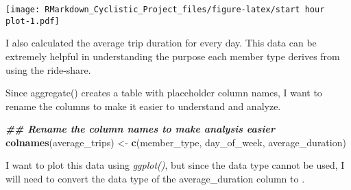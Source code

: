 \documentclass[
]{article}
\newenvironment{Shaded}{\begin{snugshade}}{\end{snugshade}}
\newcommand{\AttributeTok}[1]{\textcolor[rgb]{0.13,0.29,0.53}{#1}}
\newcommand{\DocumentationTok}[1]{\textcolor[rgb]{0.56,0.35,0.01}{\textbf{\textit{#1}}}}
\newcommand{\FunctionTok}[1]{\textcolor[rgb]{0.13,0.29,0.53}{\textbf{#1}}}
\newcommand{\NormalTok}[1]{#1}
\newcommand{\OtherTok}[1]{\textcolor[rgb]{0.56,0.35,0.01}{#1}}
\newcommand{\SpecialCharTok}[1]{\textcolor[rgb]{0.81,0.36,0.00}{\textbf{#1}}}
\newcommand{\StringTok}[1]{\textcolor[rgb]{0.31,0.60,0.02}{#1}}
\begin{document}
\texttt{[image: RMarkdown\_Cyclistic\_Project\_files/figure-latex/start hour plot-1.pdf]}

I also calculated the average trip duration for every day. This data can
be extremely helpful in understanding the purpose each member type
derives from using the ride-share.

\begin{Shaded}
\end{Shaded}

Since aggregate() creates a table with placeholder column names, I want
to rename the columns to make it easier to understand and analyze.

\begin{Shaded}
\begin{Highlighting}[]
\DocumentationTok{\#\# Rename the column names to make analysis easier}
\FunctionTok{colnames}\NormalTok{(average\_trips) }\OtherTok{\textless{}{-}} \FunctionTok{c}\NormalTok{(}\StringTok{\textquotesingle{}member\_type\textquotesingle{}}\NormalTok{, }\StringTok{\textquotesingle{}day\_of\_week\textquotesingle{}}\NormalTok{, }\StringTok{\textquotesingle{}average\_duration\textquotesingle{}}\NormalTok{)}
\end{Highlighting}
\end{Shaded}

I want to plot this data using \emph{ggplot()}, but since the data type
\emph{} cannot be used, I will need to convert the data type of the
average\_duration column to \emph{}.

\begin{Shaded}
\end{Shaded}
\end{document}
